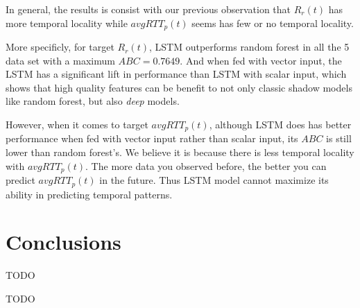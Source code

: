 \documentclass[sigconf]{acmart}
\begin{document}
In general, the results is consist with our previous observation that $R_r(t)$ has more temporal locality while $avgRTT_p(t)$ seems has few or no temporal locality.

More specificly, for target $R_r(t)$, LSTM outperforms random forest in all the 5 data set with a maximum $ABC=0.7649$. And when fed with vector input, the LSTM has a significant lift in performance than LSTM with scalar input, which shows that high quality features can be benefit to not only classic shadow models like random forest, but also \textit{deep} models.

However, when it comes to target $avgRTT_p(t)$, although LSTM does has better performance when fed with vector input rather than scalar input, its $ABC$ is still lower than random forest's. We believe it is because there is less temporal locality with $avgRTT_p(t)$. The more data you observed before, the better you can predict $avgRTT_p(t)$ in the future. Thus LSTM model cannot maximize its ability in predicting temporal patterns.
\section{Conclusions}
TODO

\begin{acks}
TODO
\end{acks}




 
\end{document}
